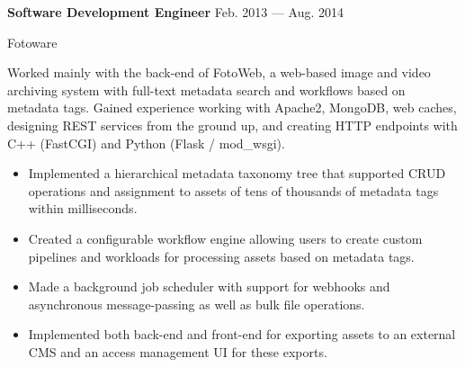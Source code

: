 \parbox[t][][t]{\linewidth}{
	\parbox{\linewidth}{{\textbf{Software Development Engineer}}
		\hfill {{Feb. 2013 --- Aug. 2014}}}
		\smallbreak
	\parbox{\linewidth}{Fotoware}

	\bigskip
	Worked mainly with the back-end of FotoWeb, a web-based image and video
	archiving system with full-text metadata search and workflows based on
	metadata tags. Gained experience working with Apache2, MongoDB, web
	caches, designing REST services from the ground up, and creating HTTP endpoints with C++ (FastCGI)
	and Python (Flask / mod\_wsgi).

	\bigskip
	\begin{itemize}
		\item{Implemented a hierarchical metadata taxonomy tree that
			supported CRUD operations and assignment to assets of tens of thousands of metadata tags within
			milliseconds.}\\[-.6em]
		\item{Created a configurable workflow engine allowing users to
			create custom pipelines and workloads for processing assets based on
			metadata tags.}\\[-.6em]
		\item{Made a background job scheduler with support for
			webhooks and asynchronous message-passing as well as
			bulk file operations.}\\[-.6em]
		\item{Implemented both back-end and front-end for exporting
			assets to an external CMS and an access 
			management UI for these exports.}\\[-.6em]
	\end{itemize}
}

